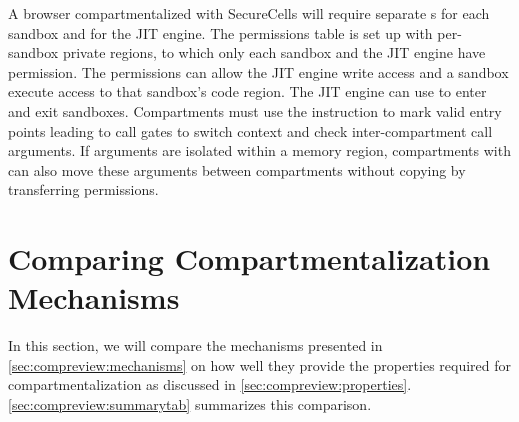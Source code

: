 A browser compartmentalized with SecureCells will require separate
\secdiv{}s for each sandbox and for the JIT engine.
The permissions table is set up with per-sandbox private regions, to which
only each sandbox and the JIT engine have permission.
The permissions can allow the JIT engine write access and a sandbox
execute access to that sandbox's code region.
The JIT engine can use  to enter and exit sandboxes.
Compartments must use the  instruction to mark valid entry points
leading to call gates to switch context and check inter-compartment call
arguments.
If arguments are isolated within a memory region, compartments with 
\seccells can also move these arguments between compartments without copying
by transferring permissions.

\section{Comparing Compartmentalization Mechanisms}
\label{sec:compreview:comparison}
In this section, we will compare the mechanisms presented in 
\autoref{sec:compreview:mechanisms} on how well they provide the properties
required for compartmentalization as discussed in 
\autoref{sec:compreview:properties}.
\autoref{sec:compreview:summarytab} summarizes this comparison.


